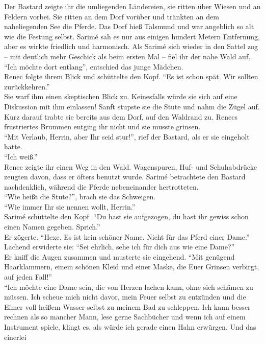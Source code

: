 Der Bastard zeigte ihr die umliegenden Ländereien, sie ritten über Wiesen und an Feldern vorbei. 
Sie ritten an dem Dorf vorüber und tränkten an dem naheliegenden See die Pferde. Das Dorf hieß 
Talsmund und war angeblich so alt wie die Festung selbst. Sarimé sah es nur aus einigen hundert 
Metern Entfernung, aber es wirkte friedlich und harmonisch. Als Sarimé sich wieder in den Sattel 
zog – mit deutlich mehr Geschick als beim ersten Mal – fiel ihr der nahe Wald auf. ``Ich möchte 
dort entlang'', entschied das junge Mädchen.\\
Renec folgte ihrem Blick und schüttelte den Kopf. ``Es ist schon spät. Wir sollten zurückkehren.''\\
Sie warf ihm einen skeptischen Blick zu. Keinesfalls würde sie sich auf eine Diskussion mit ihm 
einlassen! Sanft stupste sie die Stute und nahm die Zügel auf. Kurz darauf trabte sie bereits aus 
dem Dorf, auf den Waldrand zu. Renecs frustriertes Brummen entging ihr nicht und sie musste 
grinsen.\\
``Mit Verlaub, Herrin, aber Ihr seid stur!'', rief der Bastard, als er sie eingeholt hatte.\\
``Ich weiß.''\\
Renec zeigte ihr einen Weg in den Wald. Wagenspuren, Huf- und Schuhabdrücke zeugten davon, dass er 
öfters benutzt wurde. Sarimé betrachtete den Bastard nachdenklich, während die Pferde nebeneinander 
hertrotteten.\\
``Wie heißt die Stute?'', brach sie das Schweigen.\\
``Wie immer Ihr sie nennen wollt, Herrin.''\\
Sarimé schüttelte den Kopf. ``Du hast sie aufgezogen, du hast ihr gewiss schon einen Namen gegeben. 
Sprich.''\\
Er zögerte. ``Hexe. Es ist kein schöner Name. Nicht für das Pferd einer Dame.''\\
Lachend erwiderte sie: ``Sei ehrlich, sehe ich für dich aus wie eine Dame?''\\
Er kniff die Augen zusammen und musterte sie eingehend. ``Mit genügend Haarklammern, einem schönen 
Kleid und einer Maske, die Euer Grinsen verbirgt, auf jeden Fall!''\\
``Ich möchte eine Dame sein, die von Herzen lachen kann, ohne sich schämen zu müssen. Ich scheue 
mich nicht davor, mein Feuer selbst zu entzünden und die Eimer voll heißem Wasser selbst zu meinem 
Bad zu schleppen. Ich kann besser rechnen als so mancher Mann, lese gerne Sachbücher und wenn ich 
auf einem Instrument spiele, klingt es, als würde ich gerade einen Hahn erwürgen. Und das einerlei 
